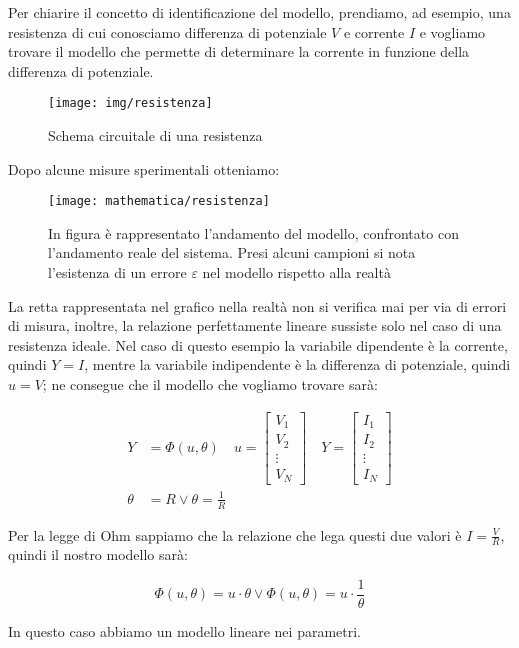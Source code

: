 \begin{esempio} %
Per chiarire il concetto di identificazione del modello, prendiamo, ad esempio, una resistenza di cui conosciamo differenza di potenziale $V$ e corrente $I$ e vogliamo trovare il modello che permette di determinare la corrente in funzione della differenza di potenziale.
\begin{figure}[htbp]
  \centering
  \texttt{[image: img/resistenza]}
  \caption{Schema circuitale di una resistenza\label{fig:resistenza}}
\end{figure}

Dopo alcune misure sperimentali otteniamo:

\begin{figure}[htbp]
  \centering
  \texttt{[image: mathematica/resistenza]}
  \caption{In figura è rappresentato l'andamento del modello, confrontato con l'andamento reale del sistema. Presi alcuni campioni si nota l'esistenza di un errore $\varepsilon$ nel modello rispetto alla realtà\label{fig:modelloresistenza}}
\end{figure}

La retta rappresentata nel grafico nella realtà non si verifica mai per via di errori di misura, inoltre, la relazione perfettamente lineare sussiste solo nel caso di una resistenza ideale.
Nel caso di questo esempio la variabile dipendente è la corrente, quindi $Y=I$, mentre la variabile indipendente è la differenza di potenziale, quindi $u=V$; ne consegue che il modello che vogliamo trovare sarà:

  \begin{align*}
    Y&=\Phi (u,\theta) \quad     u=\begin{bmatrix} V_1 \\ V_2 \\ \vdots \\ V_N\end{bmatrix} \quad  Y=\begin{bmatrix} I_1 \\ I_2 \\ \vdots \\ I_N \end{bmatrix}\\
    \theta&=R \vee \theta=\frac{1}{R}
  \end{align*}
  
Per la legge di Ohm sappiamo che la relazione che lega questi due valori è $I=\frac{V}{R}$, quindi il nostro modello sarà:

  \[ \Phi(u,\theta)=u \cdot \theta \vee \Phi(u,\theta)=u \cdot \frac{1}{\theta} \]
  
In questo caso abbiamo un modello lineare nei parametri.
\end{esempio}

